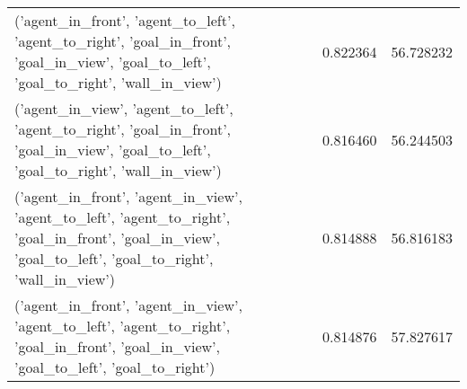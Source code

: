\begin{tabular}{lrr}
('agent\_in\_front', 'agent\_to\_left', 'agent\_to\_right', 'goal\_in\_front', 'goal\_in\_view', 'goal\_to\_left', 'goal\_to\_right', 'wall\_in\_view') & 0.822364 & 56.728232 \\
('agent\_in\_view', 'agent\_to\_left', 'agent\_to\_right', 'goal\_in\_front', 'goal\_in\_view', 'goal\_to\_left', 'goal\_to\_right', 'wall\_in\_view') & 0.816460 & 56.244503 \\
('agent\_in\_front', 'agent\_in\_view', 'agent\_to\_left', 'agent\_to\_right', 'goal\_in\_front', 'goal\_in\_view', 'goal\_to\_left', 'goal\_to\_right', 'wall\_in\_view') & 0.814888 & 56.816183 \\
('agent\_in\_front', 'agent\_in\_view', 'agent\_to\_left', 'agent\_to\_right', 'goal\_in\_front', 'goal\_in\_view', 'goal\_to\_left', 'goal\_to\_right') & 0.814876 & 57.827617 \\
\bottomrule
\end{tabular}
